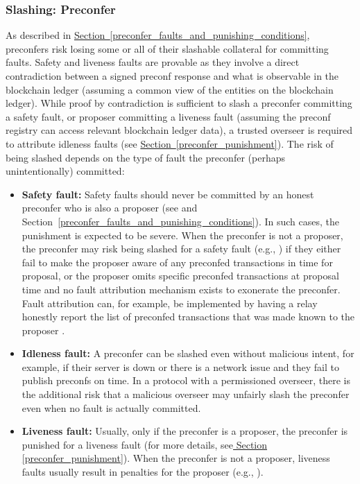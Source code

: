 \documentclass[a4paper]{article}
\theoremstyle{boldstyle}
\newcommand{\qb}[1]{\textcolor{red}{\textbf{Quentin:} #1}}
\begin{document}
    \subsubsection{Slashing: Preconfer}
    \label{risk_slashing:preconfer}
        As described in \hyperref[preconfer_faults_and_punishing_conditions]{Section~\ref{preconfer_faults_and_punishing_conditions}}, preconfers risk losing some or all of their slashable collateral for committing faults. 
        Safety and liveness faults are provable as they involve a direct contradiction between a signed preconf response and what is observable in the blockchain ledger (assuming a common view of the entities on the blockchain ledger). %
        While proof by contradiction is sufficient to slash a preconfer committing a safety fault, or proposer committing a liveness fault (assuming the preconf registry can access relevant blockchain ledger data), 
        a trusted overseer is required to attribute idleness faults (see \hyperref[preconfer_punishment]{Section~\ref{preconfer_punishment}}).
        The risk of being slashed depends on the type of fault the preconfer (perhaps unintentionally) committed:
            \begin{itemize}
                \item \textbf{Safety fault:} Safety faults should never be committed by an honest preconfer who is also a proposer (see \cite{W:Basedpreconfirmations} and Section~\ref{preconfer_faults_and_punishing_conditions}). In such cases, the punishment is expected to be severe. When the preconfer is not a proposer, the preconfer may risk being slashed for a safety fault (e.g., \cite{gateway_trust_liveness}) if they either fail to make the proposer aware of any preconfed transactions in time for proposal, or the proposer omits specific preconfed transactions at proposal time and no fault attribution mechanism exists to exonerate the preconfer. Fault attribution can, for example, be implemented by having a relay honestly report the list of preconfed transactions that was made known to the proposer \cite{W:FaultAttribution}.
                \item \textbf{Idleness fault:} A preconfer can be slashed even without malicious intent, for example, if their server is down or there is a network issue and they fail to publish preconfs on time. In a protocol with a permissioned overseer, there is the additional risk that a malicious overseer may unfairly slash the preconfer even when no fault is actually committed.
                \item \textbf{Liveness fault:} Usually, only if the preconfer is a proposer, the preconfer is  punished for a liveness fault (for more details, see\hyperref[preconfer_punishment]{ Section \ref{preconfer_punishment}}). When the preconfer is not a proposer, liveness faults usually result in penalties for the proposer (e.g., \cite{gateway_trust_liveness}).
            \end{itemize}
\end{document}
